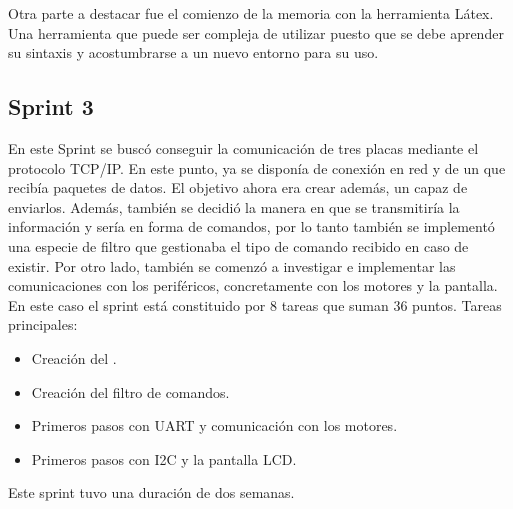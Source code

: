 

Otra parte a destacar fue el comienzo de la memoria con la herramienta Látex. Una herramienta que puede ser compleja de utilizar puesto que se debe aprender su sintaxis y acostumbrarse a un nuevo entorno para su uso.

\subsection{Sprint 3}
En este Sprint se buscó conseguir la comunicación de tres placas mediante el protocolo TCP/IP. En este punto, ya se disponía de conexión en red y de un  que recibía paquetes de datos. El objetivo ahora era crear además, un  capaz de enviarlos. Además, también se decidió la manera en que se transmitiría la información y sería en forma de comandos, por lo tanto también se implementó una especie de filtro que gestionaba el tipo de comando recibido en caso de existir. Por otro lado, también se comenzó a investigar e implementar las comunicaciones con los periféricos, concretamente con los motores y la pantalla. En este caso el sprint está constituido por 8 tareas que suman 36 puntos. Tareas principales:
\begin{itemize}
\item Creación del .
\item Creación del filtro de comandos.
\item Primeros pasos con UART y comunicación con los motores.
\item Primeros pasos con I2C y la pantalla LCD.
\end{itemize}


Este sprint tuvo una duración de dos semanas.

